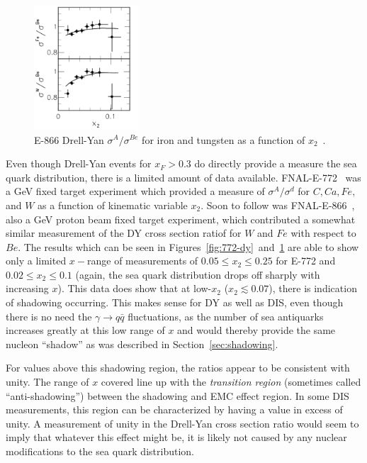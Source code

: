 \begin{figure}
\centering
\includegraphics[width=0.35\textwidth]{figures/background/e866-emc-ratio.png}
\caption{E-866 Drell-Yan $\sigma^A/\sigma^{Be}$ for iron and tungsten as a function of $x_2$~\cite{Vasilev:1999fa}.}
\label{fig:866-emc}
\end{figure}
Even though Drell-Yan events for $x_F>0.3$ do directly provide a measure the sea quark distribution, there is a limited amount of data available. FNAL-E-772~\cite{PhysRevLett.64.2479} was a \unit[800]{GeV} fixed target experiment which provided a measure of $\sigma^A/\sigma^d$ for $C, Ca, Fe,$ and $W$ as a function of kinematic variable $x_2$. Soon to follow was FNAL-E-866~\cite{Vasilev:1999fa}, also a \unit[800]{GeV} proton beam fixed target experiment, which contributed a somewhat similar measurement of the DY cross section ratiof for $W$ and $Fe$ with respect to $Be$. The results which can be seen in Figures~\ref{fig:772-dy}~and~\ref{fig:866-emc} are able to show only a limited $x-$range of measurements of $0.05\leq x_2\leq 0.25$ for E-772 and $0.02\leq x_2 \leq 0.1$ (again, the sea quark distribution drops off sharply with increasing $x$). This data does show that at low-$x_2$ ($x_2 \lesssim 0.07$), there is indication of shadowing occurring. This makes sense for DY as well as DIS, even though there is no need the $\gamma\rightarrow q\bar{q}$ fluctuations, as the number of sea antiquarks increases greatly at this low range of $x$ and would thereby provide the same nucleon ``shadow'' as was described in Section~\ref{sec:shadowing}. 

For values above this shadowing region, the ratios appear to be consistent with unity. The range of $x$ covered line up with the \emph{transition region} (sometimes called ``anti-shadowing'') between the shadowing and EMC effect region. In some DIS measurements, this region can be characterized by having a value in excess of unity. A measurement of unity in the Drell-Yan cross section ratio would seem to imply that whatever this effect might be, it is likely not caused by any nuclear modifications to the sea quark distribution.

